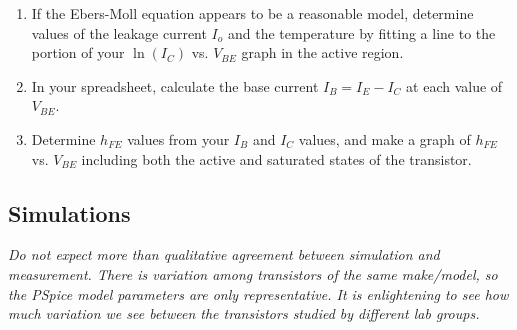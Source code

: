 \documentclass[11pt]{article}
\begin{document}
\begin{enumerate}
\item If the Ebers-Moll equation appears to be a reasonable model,
  determine values of the leakage current $I_o$ and the temperature by
  fitting a line to the portion of your $\ln(I_C)$ vs. $V_{BE}$ graph
  in the active region. 

\item In your spreadsheet, calculate the base current $I_B = I_E -
  I_C$ at each value of $V_{BE}$.
  
\item Determine $h_{FE}$ values from your $I_B$ and $I_C$ values, and
  make a graph of $h_{FE}$ vs. $V_{BE}$ including both the active and
  saturated states of the transistor.
\end{enumerate}

\subsection*{Simulations}

\emph{Do not expect more than qualitative agreement between simulation
and measurement. There is variation among transistors of the same
make/model, so the PSpice model parameters are only representative. It
is enlightening to see how much variation we see between the transistors
studied by different lab groups.}
\end{document}
